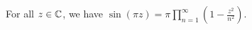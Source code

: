\documentclass{homework}
\begin{document}
                                                                                                                                        \begin{problem}\label{infinite-product-sine}For all $z \in \mathbb{C}$, we have 
                                                                                                                                          \(
                                                                                                                                              \sin \left( \pi z \right) = \pi \displaystyle\prod_{n=1}^\infty \left( 1 - \frac{z^2}{n^2} \right)
                                                                                                                                                \). %
                                                                                                                                                \end{problem}
\end{document}
